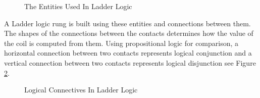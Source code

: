 \begin{figure}[h!]
 \begin{center}
\end{center}
\label{fig:pelicanladder}
\caption{The Entities Used In Ladder Logic}

\end{figure}

\medskip

A Ladder logic rung is built using these entities and connections between
them. The shapes of the connections between the contacts determines how the
value of the coil is computed from them. Using propositional logic for comparison,  
a horizontal connection between two contacts represents logical conjunction
and a vertical connection between two contacts represents logical
disjunction see Figure \ref{fig:ladderconnectives}. 

\medskip

\begin{figure}[h!]
 \begin{center}
\end{center}

\label{fig:ladderconnectives}
\caption{Logical Connectives In Ladder Logic}

\end{figure}


